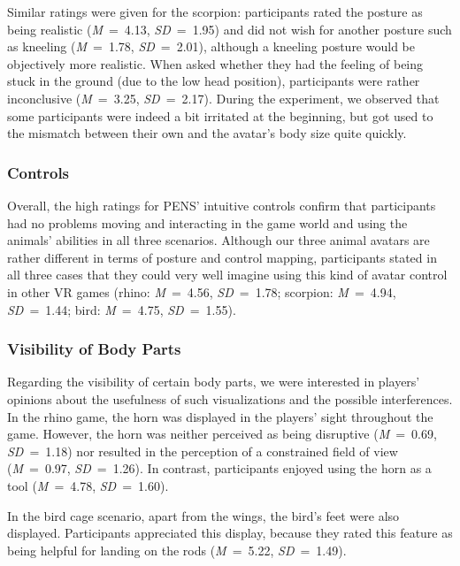 \documentclass{sigchi}
\begin{document}
Similar ratings were given for the scorpion: participants rated the posture as being realistic (\textit{M}~=~4.13, \textit{SD}~=~1.95) and did not wish for another posture such as kneeling (\textit{M}~=~1.78, \textit{SD}~=~2.01), %
although a kneeling posture would be objectively more realistic. When asked whether they had the feeling of being stuck in the ground (due to the low head position), participants were rather inconclusive (\textit{M}~=~3.25, \textit{SD}~=~2.17). %
During the experiment, we observed that some participants were indeed a bit irritated at the beginning, but got used to the mismatch between their own and the avatar's body size quite quickly. 

\subsubsection{Controls}
Overall, the high ratings for PENS' intuitive controls confirm that participants had no problems moving and interacting in the game world and using the animals' abilities in all three scenarios.
Although our three animal avatars are rather different in terms of posture and control mapping, participants stated in all three cases that they could very well imagine using this kind of avatar control in other VR games (rhino: \textit{M}~=~4.56, \textit{SD}~=~1.78; scorpion: \textit{M}~=~4.94, \textit{SD}~=~1.44; bird: \textit{M}~=~4.75, \textit{SD}~=~1.55).


\subsubsection{Visibility of Body Parts}
Regarding the visibility of certain body parts, we were interested in players' opinions about the usefulness of such visualizations and the possible interferences. In the rhino game, the horn was displayed in the players' sight throughout the game. However, the horn was neither perceived as being disruptive (\textit{M}~=~0.69, \textit{SD}~=~1.18) %
nor resulted in the perception of a constrained field of view (\textit{M}~=~0.97, \textit{SD}~=~1.26). %
In contrast, participants enjoyed using the horn as a tool (\textit{M}~=~4.78, \textit{SD}~=~1.60). %

In the bird cage scenario, apart from the wings, the bird's feet were also displayed. Participants appreciated this display, because they rated this feature as being helpful for landing on the rods (\textit{M}~=~5.22, \textit{SD}~=~1.49). %
\end{document}
